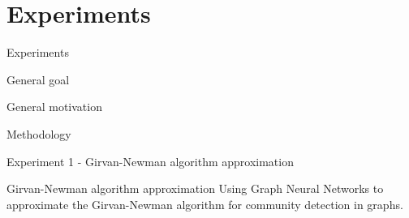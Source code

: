 \documentclass[xcolor=table]{beamer}
\begin{document}
\section{Experiments}
\begin{frame}{Experiments}
    \begin{block}{General goal}{

    }\end{block}
    \begin{block}{General motivation}{

    }\end{block}
    \begin{block}{Methodology}{
    }\end{block}



\end{frame}




\begin{frame}{Experiment 1 - Girvan-Newman algorithm approximation }{}

\begin{block}{Girvan-Newman algorithm approximation}{
       Using Graph Neural Networks to approximate the Girvan-Newman algorithm for community detection in graphs.
    }\end{block}


\end{frame}
\end{document}
